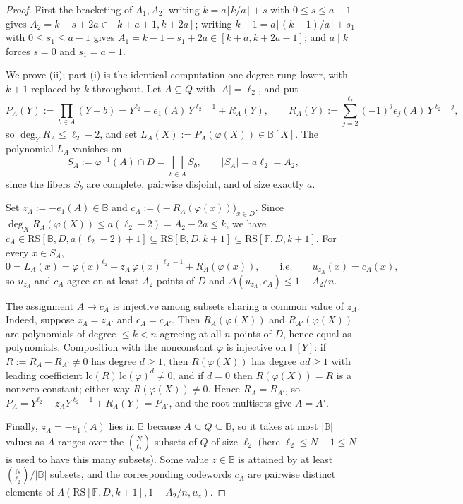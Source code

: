 \documentclass[11pt]{article}
\theoremstyle{definition}
\theoremstyle{remark}
\newcommand{\F}{\mathbb{F}}
\newcommand{\B}{\mathbb{B}}
\newcommand{\RS}{\mathrm{RS}}
\newcommand{\dist}{\Delta}
\newcommand{\Lst}{\Lambda}
\newcommand{\eone}{e_1}
\begin{document}
\begin{proof}
First the bracketing of $A_1,A_2$: writing $k=a\lfloor k/a\rfloor+s$ with $0\le s\le a-1$ gives $A_2=k-s+2a\in[k+a+1,k+2a]$; writing $k-1=a\lfloor(k-1)/a\rfloor+s_1$ with $0\le s_1\le a-1$ gives $A_1=k-1-s_1+2a\in[k+a,k+2a-1]$; and $a\mid k$ forces $s=0$ and $s_1=a-1$.

We prove (ii); part (i) is the identical computation one degree rung lower, with $k+1$ replaced by $k$ throughout. Let $A\subseteq Q$ with $|A|=\ell_2$, and put
\[
P_A(Y):=\prod_{b\in A}(Y-b)=Y^{\ell_2}-\eone(A)\,Y^{\ell_2-1}+R_A(Y),
\qquad
R_A(Y):=\sum_{j=2}^{\ell_2}(-1)^je_j(A)\,Y^{\ell_2-j},
\]
so $\deg_YR_A\le\ell_2-2$, and set $L_A(X):=P_A(\varphi(X))\in\B[X]$. The polynomial $L_A$ vanishes on
\[
S_A:=\varphi^{-1}(A)\cap D=\bigsqcup_{b\in A}S_b,
\qquad
|S_A|=a\ell_2=A_2,
\]
since the fibers $S_b$ are complete, pairwise disjoint, and of size exactly $a$.

Set $z_A:=-\eone(A)\in\B$ and $c_A:=\bigl(-R_A(\varphi(x))\bigr)_{x\in D}$. Since $\deg_XR_A(\varphi(X))\le a(\ell_2-2)=A_2-2a\le k$, we have $c_A\in\RS[\B,D,a(\ell_2-2)+1]\subseteq\RS[\B,D,k+1]\subseteq\RS[\F,D,k+1]$. For every $x\in S_A$,
\[
0=L_A(x)=\varphi(x)^{\ell_2}+z_A\,\varphi(x)^{\ell_2-1}+R_A(\varphi(x)),
\qquad\text{i.e.}\qquad
u_{z_A}(x)=c_A(x),
\]
so $u_{z_A}$ and $c_A$ agree on at least $A_2$ points of $D$ and $\dist(u_{z_A},c_A)\le1-A_2/n$.

The assignment $A\mapsto c_A$ is injective among subsets sharing a common value of $z_A$. Indeed, suppose $z_A=z_{A'}$ and $c_A=c_{A'}$. Then $R_A(\varphi(X))$ and $R_{A'}(\varphi(X))$ are polynomials of degree $\le k<n$ agreeing at all $n$ points of $D$, hence equal as polynomials. Composition with the nonconstant $\varphi$ is injective on $\F[Y]$: if $R:=R_A-R_{A'}\ne0$ has degree $d\ge1$, then $R(\varphi(X))$ has degree $ad\ge1$ with leading coefficient $\mathrm{lc}(R)\,\mathrm{lc}(\varphi)^d\ne0$, and if $d=0$ then $R(\varphi(X))=R$ is a nonzero constant; either way $R(\varphi(X))\ne0$. Hence $R_A=R_{A'}$, so $P_A=Y^{\ell_2}+z_AY^{\ell_2-1}+R_A(Y)=P_{A'}$, and the root multisets give $A=A'$.

Finally, $z_A=-\eone(A)$ lies in $\B$ because $A\subseteq Q\subseteq\B$, so it takes at most $|\B|$ values as $A$ ranges over the $\binom N{\ell_2}$ subsets of $Q$ of size $\ell_2$ (here $\ell_2\le N-1\le N$ is used to have this many subsets). Some value $z\in\B$ is attained by at least $\binom N{\ell_2}/|\B|$ subsets, and the corresponding codewords $c_A$ are pairwise distinct elements of $\Lst(\RS[\F,D,k+1],1-A_2/n,u_z)$.
\end{proof}
\end{document}
